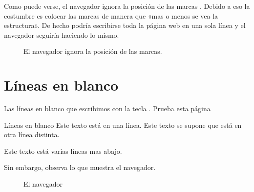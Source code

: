 \documentclass[a4paper,12pt,spanish]{sphinxmanual}
\begin{document}
Como puede verse, el navegador ignora la posición de las marcas . Debido a eso la costumbre es colocar las marcas de manera que «mas o menos se vea la estructura». De hecho podría escribirse toda la página web en una sola línea y el navegador seguiría haciendo lo mismo.

\begin{figure}[htbp]
\centering
\capstart

\noindent{}
\caption{El navegador ignora la posición de las marcas.}\label{\detokenize{index:id10}}\end{figure}


\section{Líneas en blanco}
\label{\detokenize{index:lineas-en-blanco}}
Las líneas en blanco que escribimos con la tecla  . Prueba esta página

%
\begin{sphinxVerbatim}[commandchars=\\\{\}]
         Líneas en blanco
     Este texto está en una línea.
     Este texto se supone que está en otra línea distinta.


     Este texto está varias líneas mas abajo.
\end{sphinxVerbatim}

Sin embargo, observa lo que muestra el navegador.

\begin{figure}[htbp]
\centering
\capstart

\noindent{}
\caption{El navegador }\label{\detokenize{index:id11}}\end{figure}
\end{document}
